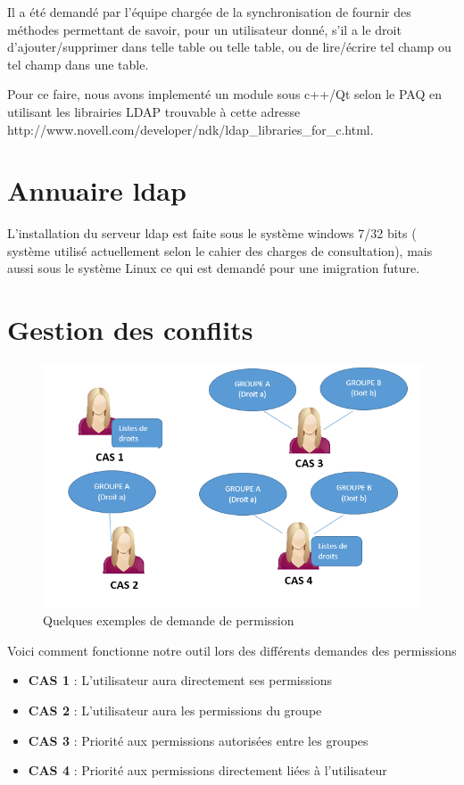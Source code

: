 \documentclass[11pt,fleqn]{report}
\begin{document}
Il a été demandé par l’équipe chargée de la synchronisation de fournir des méthodes permettant de savoir, pour un utilisateur donné, s’il a le droit d’ajouter/supprimer dans telle table ou telle table, ou de lire/écrire tel champ ou tel champ dans une table. 

Pour ce faire, nous avons implementé un module sous c++/Qt selon le PAQ en utilisant les librairies LDAP trouvable à cette adresse http://www.novell.com/developer/ndk/ldap\_libraries\_for\_c.html.

\section{Annuaire ldap}
L'installation du serveur ldap est faite sous le système windows 7/32 bits ( système utilisé actuellement selon le cahier des charges de consultation), mais aussi sous le système Linux ce qui est demandé pour une imigration future. 

\section{Gestion des conflits}
\begin{figure}[htbp]
	\centering
	\includegraphics[scale=0.7]{Images/conflitsDroits.png}
	\caption{Quelques exemples de demande de permission }
	\label{conflitsDroits}
\end{figure}

Voici comment fonctionne notre outil lors des différents demandes des permissions
\begin{itemize}
\item \textbf{CAS 1 } : L'utilisateur aura directement ses permissions
\item \textbf{CAS 2 } : L'utilisateur aura les permissions du groupe
\item \textbf{CAS 3 } : Priorité aux permissions autorisées entre les groupes
\item \textbf{CAS 4 } : Priorité aux permissions directement liées à l'utilisateur
\end{itemize}
\end{document}

